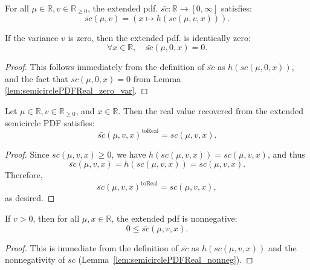 \begin{lemma}
  \leanok
  \label{lem:semicirclePDF_def}
  For all $\mu \in \mathbb{R} , v \in \mathbb{R}_{\geq 0}$, the extended pdf. $ \bar{sc} : \mathbb{R} \to [0,\infty]$  satisfies:
  $$
    \bar{sc}(\mu,v) = \left( x \mapsto h(sc(\mu,v,x)) \right).
  $$
\end{lemma}

\begin{lemma}
  \leanok
  \label{lem:semicirclePDF_zero_var}
  If the variance $v$ is zero, then the extended pdf. is identically zero:
 $$
    \forall x \in \mathbb{R}, \quad \bar{sc}(\mu,0,x) = 0.
 $$
\end{lemma}
\begin{proof}
    This follows immediately from the definition of $\bar{sc}$ as $h(sc(\mu,0,x))$, and the fact that $sc(\mu,0,x) = 0$ from Lemma \ref{lem:semicirclePDFReal_zero_var}.
\end{proof}

\begin{lemma}
    \leanok
    \label{lem:toReal_semicirclePDF}
    Let $ \mu \in \mathbb{R} ,  v \in \mathbb{R}_{\ge 0}$, and $x \in \mathbb{R} $.
Then the real value recovered from the extended semicircle PDF satisfies:
\[
    \bar{sc}(\mu, v, x)^{\operatorname{toReal}} = sc(\mu, v, x).
\]
\end{lemma}
\begin{proof}
Since $sc(\mu, v, x) \ge 0$, we have $h(sc(\mu, v, x)) = sc(\mu, v, x)$, and thus
\[
    \bar{sc}(\mu, v, x) = h(sc(\mu, v, x)) = sc(\mu, v, x).
\]
Therefore,
\[
    \bar{sc}(\mu, v, x)^{\operatorname{toReal}} = sc(\mu, v, x),
\]
as desired.
\end{proof}

\begin{lemma}
  \leanok
  \label{lem:semicirclePDF_nonneg}
  If $v > 0$, then for all $\mu, x \in \mathbb{R}$, the extended pdf is nonnegative:
  \[
      0 \le \bar{sc}(\mu,v,x).
  \]
\end{lemma}
\begin{proof}
    This is immediate from the definition of $\bar{sc}$ as $h(sc(\mu,v,x))$ and the nonnegativity of $sc$ (Lemma~\ref{lem:semicirclePDFReal_nonneg}).
\end{proof}

